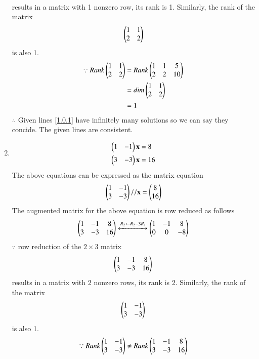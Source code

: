 \documentclass[journal,12pt,twocolumn]{IEEEtran}
\begin{document}
\begin{enumerate}
\begin{align}
\end{align}
%
results in a matrix with 1 nonzero row, its rank is 1. 
%
Similarly, the rank of the matrix 
\begin{align}
\begin{pmatrix}1 & 1 \\2 & 2 \end{pmatrix} 
\end{align}
%
is also 1.
%
\begin{align}
\because Rank \begin{pmatrix}1 & 1\\2 & 2\end{pmatrix} &= Rank\begin{pmatrix}1 & 1 & 5\\2 & 2 & 10\end{pmatrix} \nonumber\\
 &=dim \begin{pmatrix}1 & 1\\2 & 2\end{pmatrix}\nonumber\\
 &=1
\end{align}
$\therefore$ Given lines \eqref{1.0.1} have infinitely many solutions so we can say they concide. The given lines are consistent. 
\item
\begin{align}
\begin{split}
\begin{pmatrix}1 & -1 \end{pmatrix}\mathbf{x}&=8  
\\
\begin{pmatrix}3 & -3 \end{pmatrix}\mathbf{x}&=16
\end{split}
\end{align}
The above equations can be expressed as the matrix equation
\begin{align}
\begin{pmatrix}1 & -1\\3 & -3\end{pmatrix}
//
\mathbf{x} = \begin{pmatrix}8\\16\end{pmatrix}
\end{align}
%
The augmented matrix for the above equation is row reduced as follows
\begin{align}
\begin{pmatrix}1 & -1 & 8\\3 &-3 & 16 \end{pmatrix}
\xleftrightarrow {R_2\leftarrow R_2-3R_1}\begin{pmatrix}1 & -1 & 8 \\0 & 0 & -8\end{pmatrix}
\\
\end{align}
%
$\because$ row reduction of the $2\times 3$ matrix
%
\begin{align}
\begin{pmatrix}1 & -1 & 8\\3 & -3 & 16\end{pmatrix}
\end{align}
%
results in a matrix with 2 nonzero rows, its rank is 2. 
%
Similarly, the rank of the matrix 
\begin{align}
\begin{pmatrix}1 & -1 \\3 & -3 \end{pmatrix} 
\end{align}
%
is also 1.
%
\begin{align}
\because Rank \myvec{1 & -1\\3 & -3} \ne Rank\myvec{1 & -1 & 8\\3 & -3 & 16}\nonumber\\

\end{align}
\end{enumerate}
\end{document}

